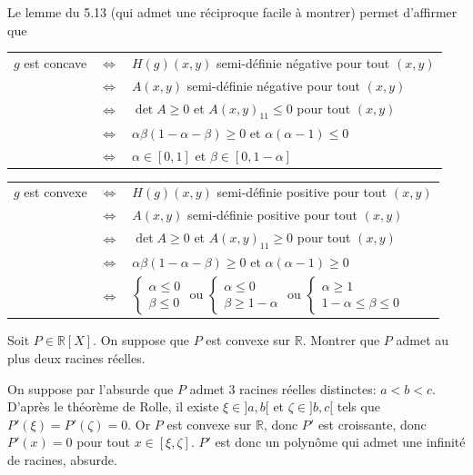 \documentclass{fancybook}
\begin{document}
Le lemme du 5.13 (qui admet une réciproque facile à montrer) permet d'affirmer que \newline
\setlength{\tabcolsep}{0.1em}
\begin{tabular}{ccl}
$g$ est concave & $\iff$ & $H(g)(x,y)$ semi-définie négative pour tout $(x,y)$\\
& $\iff$ & $A(x,y)$ semi-définie négative pour tout $(x,y)$ \\
& $\iff$ & $\det A\geq 0$ et $A(x,y)_{11} \leq 0$ pour tout $(x,y)$ \\
& $\iff$ & $\alpha \beta (1-\alpha -\beta)\geq 0 $ et $\alpha (\alpha-1)\leq 0$ \\
& $\iff$ & $\alpha \in [0,1]$ et $\beta\in [0,1-\alpha]$
\end{tabular}\newline
\newline
\newline
\setlength{\tabcolsep}{0.1em}
\begin{tabular}{ccl}
$g$ est convexe & $\iff$ & $H(g)(x,y)$ semi-définie positive pour tout $(x,y)$\\
& $\iff$ & $A(x,y)$ semi-définie positive pour tout $(x,y)$ \\
& $\iff$ & $\det A\geq 0$ et $A(x,y)_{11} \geq 0$ pour tout $(x,y)$ \\
& $\iff$ & $\alpha \beta (1-\alpha -\beta)\geq 0 $ et $\alpha (\alpha-1)\geq 0$ \\
& $\iff$ & $\begin{cases} \alpha\leq 0 \\ \beta \leq 0 \end{cases}$ ou \; $\begin{cases} \alpha\leq 0 \\ \beta \geq 1-\alpha \end{cases}$ ou \; $\begin{cases} \alpha\geq 1 \\ 1-\alpha \leq \beta \leq 0 \end{cases}$
\end{tabular}\newline



\begin{exercice}
Soit $P\in \mathbb R[X]$. On suppose que $P$ est convexe sur $\mathbb R$. Montrer que $P$ admet au plus deux racines réelles.
\end{exercice}
On suppose par l'absurde que $P$ admet $3$ racines réelles distinctes: $a<b<c$. D'après le théorème de Rolle, il existe $\xi\in ]a,b[$ et $\zeta \in ]b,c[$ tels que $P'(\xi) = P'(\zeta)=0$. Or $P$ est convexe sur $\mathbb R$, donc $P'$ est croissante, donc $P'(x)=0$ pour tout $x\in [\xi,\zeta]$. $P'$ est donc un polynôme qui admet une infinité de racines, absurde.
\end{document}
